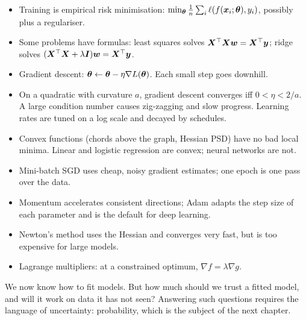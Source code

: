 \begin{keytakeaways}
\begin{itemize}
  \item Training is empirical risk minimisation:
    $\min_{\bm{\theta}}\frac1n\sum_i\ell(f(\bm{x}_i;\bm{\theta}), y_i)$, possibly plus a
    regulariser.
  \item Some problems have formulas: least squares solves
    $\bm{X}^\top\bm{X}\bm{w} = \bm{X}^\top\bm{y}$; ridge solves $(\bm{X}^\top\bm{X} + \lambda\bm{I})\bm{w} =
    \bm{X}^\top\bm{y}$.
  \item Gradient descent: $\bm{\theta} \leftarrow \bm{\theta} - \eta\nabla L(\bm{\theta})$. Each
    small step goes downhill.
  \item On a quadratic with curvature $a$, gradient descent converges iff
    $0 < \eta < 2/a$. A large condition number causes zig-zagging and slow
    progress. Learning rates are tuned on a log scale and decayed by schedules.
  \item Convex functions (chords above the graph, Hessian PSD) have no bad local
    minima. Linear and logistic regression are convex; neural networks are not.
  \item Mini-batch SGD uses cheap, noisy gradient estimates; one epoch is one pass
    over the data.
  \item Momentum accelerates consistent directions; Adam adapts the step size of
    each parameter and is the default for deep learning.
  \item Newton's method uses the Hessian and converges very fast, but is too
    expensive for large models.
  \item Lagrange multipliers: at a constrained optimum, $\nabla f = \lambda\nabla g$.
\end{itemize}
\end{keytakeaways}

We now know how to fit models. But how much should we trust a fitted model, and
will it work on data it has not seen? Answering such questions requires the
language of uncertainty: probability, which is the subject of the next chapter.
